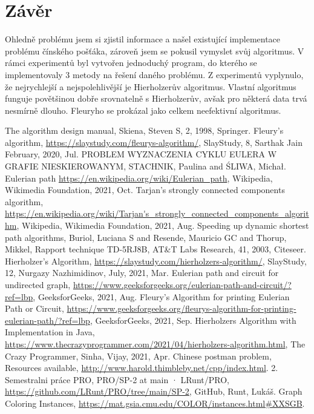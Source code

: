 \documentclass[12pt, a4paper]{article}
\begin{document}
\section{Závěr}
Ohledně problému jsem si zjistil informace a našel existující implementace problému čínského pošťáka, zároveň jsem se pokusil vymyslet svůj algoritmus. V rámci experimentů byl vytvořen jednoduchý program, do kterého se implementovaly 3 metody na řešení daného problému. Z experimentů vyplynulo, že nejrychlejší a nejspolehlivější je Hierholzerův algoritmus. Vlastní algoritmus funguje povětšinou dobře srovnatelně s Hierholzerův, avšak pro některá data trvá nesmírně dlouho. Fleuryho se prokázal jako celkem neefektivní algoritmus. 

\begin{thebibliography}{9}

		The algorithm design manual,
		Skiena, Steven S,	
		2,
		1998,
		Springer.
	     	Fleury's algorithm,
	     	\url {https://slaystudy.com/fleurys-algorithm/}, 
		SlayStudy, 
		8, Sarthak Jain February, 
		2020, 
		Jul.
		PROBLEM WYZNACZENIA CYKLU EULERA W GRAFIE NIESKIEROWANYM,
		STACHNIK, Paulina and {\'S}LIWA, Micha{\l}.
 	  	 Eulerian path
	  	 \url {https://en.wikipedia.org/wiki/Eulerian_path}, 
	  	 Wikipedia,
	  	 Wikimedia Foundation,
	   	2021, 
	   	Oct.
		Tarjan's strongly connected components algorithm,
		\url {https://en.wikipedia.org/wiki/Tarjan's_strongly_connected_components_algorithm},
		Wikipedia,
		Wikimedia Foundation,
		2021,
		Aug.
		Speeding up dynamic shortest path algorithms,
 		Buriol, Luciana S and Resende, Mauricio GC and Thorup, Mikkel,
		Rapport technique TD-5RJ8B, AT\&T Labs Research,
  		41,
  		2003,
  		Citeseer.
		Hierholzer's Algorithm,
		\url {https://slaystudy.com/hierholzers-algorithm/},
 		SlayStudy,
		12, Nurgazy Nazhimidinov,
		July, 
		2021, 
		Mar.
 		Eulerian path and circuit for undirected graph,
		\url {https://www.geeksforgeeks.org/eulerian-path-and-circuit/?ref=lbp}, 
		GeeksforGeeks, 
		2021,	
		Aug.
		Fleury's Algorithm for printing Eulerian Path or Circuit, 
		\url {https://www.geeksforgeeks.org/fleurys-algorithm-for-printing-eulerian-path/?ref=lbp}, 
		GeeksforGeeks,
		2021, 
		Sep.
		Hierholzers Algorithm with Implementation in Java,
		\url {https://www.thecrazyprogrammer.com/2021/04/hierholzers-algorithm.html},
		The Crazy Programmer, 
		Sinha, Vijay,
		2021,
		Apr.
		Chinese postman problem,
		Resources available, 
		\url {http://www.harold.thimbleby.net/cpp/index.html}.
		2. Semestralni práce PRO,
		PRO/SP-2 at main · LRunt/PRO, 
		\url {https://github.com/LRunt/PRO/tree/main/SP-2}, 
		GitHub, 
		Runt, Lukáš.
		Graph Coloring Instances,
		\url {https://mat.gsia.cmu.edu/COLOR/instances.html#XXSGB}.

 \end{thebibliography}
\end{document}
